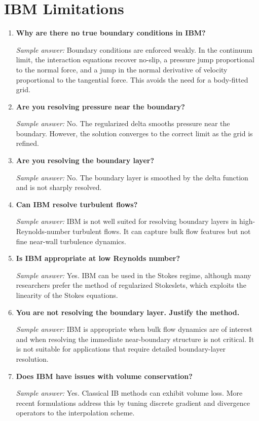 \documentclass[11pt]{article}
\begin{document}
\section*{IBM Limitations}

\begin{enumerate}[label=\arabic*.]

\item \textbf{Why are there no true boundary conditions in IBM?}

\textit{Sample answer:}  
Boundary conditions are enforced weakly. In the continuum limit, the interaction equations recover no-slip, a pressure jump proportional to the normal force, and a jump in the normal derivative of velocity proportional to the tangential force. This avoids the need for a body-fitted grid.

\item \textbf{Are you resolving pressure near the boundary?}

\textit{Sample answer:}  
No. The regularized delta smooths pressure near the boundary. However, the solution converges to the correct limit as the grid is refined.

\item \textbf{Are you resolving the boundary layer?}

\textit{Sample answer:}  
No. The boundary layer is smoothed by the delta function and is not sharply resolved.

\item \textbf{Can IBM resolve turbulent flows?}

\textit{Sample answer:}  
IBM is not well suited for resolving boundary layers in high-Reynolds-number turbulent flows. It can capture bulk flow features but not fine near-wall turbulence dynamics.

\item \textbf{Is IBM appropriate at low Reynolds number?}

\textit{Sample answer:}  
Yes. IBM can be used in the Stokes regime, although many researchers prefer the method of regularized Stokeslets, which exploits the linearity of the Stokes equations.

\item \textbf{You are not resolving the boundary layer. Justify the method.}

\textit{Sample answer:}  
IBM is appropriate when bulk flow dynamics are of interest and when resolving the immediate near-boundary structure is not critical. It is not suitable for applications that require detailed boundary-layer resolution.

\item \textbf{Does IBM have issues with volume conservation?}

\textit{Sample answer:}  
Yes. Classical IB methods can exhibit volume loss. More recent formulations address this by tuning discrete gradient and divergence operators to the interpolation scheme.

\end{enumerate}
\end{document}
